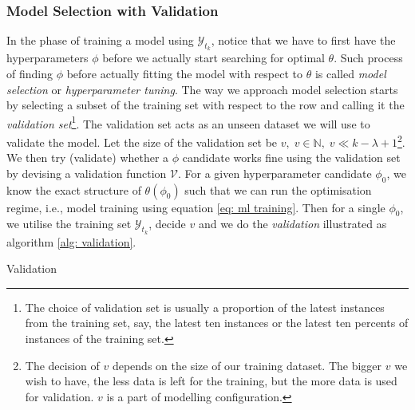 \subsubsection{Model Selection with Validation}
In the phase of training a model using $\mathcal{Y}_{t_k}$, notice that we have to first have the hyperparameters $\phi$ before we actually start searching for optimal $\theta$. Such process of finding $\phi$ before actually fitting the model with respect to $\theta$ is called \textit{model selection} or \textit{hyperparameter tuning}. The way we approach model selection starts by selecting a subset of the training set with respect to the row and calling it the \textit{validation set}\footnote{The choice of validation set is usually a proportion of the latest instances from the training set, say, the latest ten instances or the latest ten percents of instances of the training set.}. The validation set acts as an unseen dataset we will use to validate the model. Let the size of the validation set be $v, \; v \in \mathbb{N}, \; v \ll k - \lambda + 1$\footnote{The decision of $v$ depends on the size of our training dataset. The bigger $v$ we wish to have, the less data is left for the training, but the more data is used for validation. $v$ is a part of modelling configuration.}. We then try (validate) whether a $\phi$ candidate works fine using the validation set by devising a validation function $\mathcal{V}$. For a given hyperparameter candidate $\phi_0$, we know the exact structure of $\theta(\phi_0)$ such that we can run the optimisation regime, i.e., model training using equation \ref{eq: ml training}. Then for a single $\phi_0$, we utilise the training set $\mathcal{Y}_{t_k}$, decide $v$ and we do the \textit{validation} illustrated as algorithm \ref{alg: validation}.
\begin{algorithm}
    \caption{Validation}\label{alg: validation}
    \begin{algorithmic}
    \EndFor
    \end{algorithmic}
\end{algorithm}
